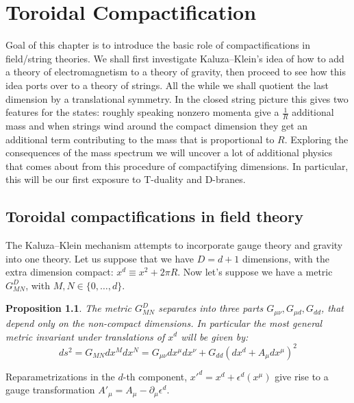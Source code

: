 \documentclass{report}
\theoremstyle{plain}
\newtheorem{proposition}[theorem]{Proposition}
\theoremstyle{definition}
\theoremstyle{remark}
\newcommand{\FR}[2]{\frac{#1}{#2}}
\newcommand{\di}{\partial}
\begin{document}
\chapter{Toroidal Compactification}
\newcommand{\talpha}{\tilde\alpha}

Goal of this chapter is to introduce the basic role of compactifications in
field/string theories. We shall first investigate Kaluza--Klein's idea of
how to add a theory of electromagnetism to a theory of gravity, then
proceed to see how this idea ports over to a theory of strings. All the
while we shall quotient the last dimension by a translational symmetry.
In the closed string picture this gives two features for the states:
roughly speaking nonzero momenta give a $\FR{1}{R}$ additional mass and
when strings wind around the compact dimension they get an additional term
contributing to the mass that is proportional to $R$. Exploring the
consequences of the mass spectrum we will uncover a lot of additional
physics that comes about from this procedure of compactifying dimensions.
In particular, this will be our first exposure to T-duality and D-branes.

\section{Toroidal compactifications in field theory}
The Kaluza--Klein mechanism attempts to incorporate gauge theory and gravity
into one theory. Let us suppose that we have $D=d+1$ dimensions, with
the extra dimension compact: $x^d\equiv x^2+2\pi R$. Now let's suppose we
have a metric $G^D_{MN}$, with $M,N\in \{0,\dots,d\}$. 

\begin{proposition}
    The metric $G^D_{MN}$ separates into three parts $G_{\mu\nu}, G_{\mu
    d}, G_{dd}$, that depend only on the non-compact dimensions. In
    particular the most general metric invariant under translations of
    $x^d$ will be given by:
\[ ds^2 = G_{MN}dx^M dx^N = G_{\mu\nu}dx^\mu dx^\nu+G_{dd}(dx^d+A_\mu
dx^\mu)^2\]
\end{proposition}
Reparametrizations in the $d$-th component, $x'^d=x^d+\epsilon^d(x^\mu)$
give rise to a gauge transformation $A'_\mu = A_\mu - \di_\mu\epsilon^d$.
\end{document}
